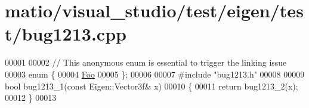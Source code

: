 \hypertarget{matio_2visual__studio_2test_2eigen_2test_2bug1213_8cpp_source}{}\section{matio/visual\+\_\+studio/test/eigen/test/bug1213.cpp}
\label{matio_2visual__studio_2test_2eigen_2test_2bug1213_8cpp_source}

\begin{DoxyCode}
00001 
00002 \textcolor{comment}{// This anonymous enum is essential to trigger the linking issue}
00003 \textcolor{keyword}{enum} \{
00004   \hyperlink{struct_foo}{Foo}
00005 \};
00006 
00007 \textcolor{preprocessor}{#include "bug1213.h"}
00008 
00009 \textcolor{keywordtype}{bool} bug1213\_1(\textcolor{keyword}{const} Eigen::Vector3f& x)
00010 \{
00011   \textcolor{keywordflow}{return} bug1213\_2(x);
00012 \}
00013 
\end{DoxyCode}

